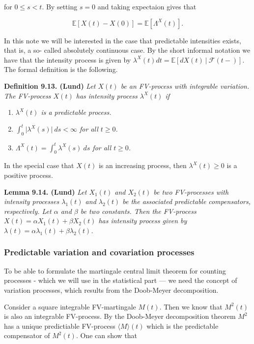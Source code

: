 \documentclass[a4paper,10pt,openany]{book}
\providecommand{\tightlist}{%
 \setlength{\itemsep}{0pt}\setlength{\parskip}{0pt}}
\begin{document}
for \(0\le s< t\). By setting \(s=0\) and taking expectaion gives that

\[
\mathbb E[X(t)-X(0)]=\mathbb E[\Lambda^X(t)].
\]

In this note we will be interested in the case that predictable intensities exists, that is, a so- called absolutely continuous case. By the short informal notation we have that the intensity process is given by \(\lambda^X(t)dt = \mathbb E[dX(t)\ \vert\ \mathcal F(t−)]\). The formal definition is the following.

\textbf{Definition 9.13. (Lund)} \emph{Let \(X(t)\) be an FV-process with integrable variation. The FV-process \(X(t)\) has intensity process \(\lambda^X(t)\) if}

\begin{enumerate}
\def\labelenumi{(\roman{enumi})}
\tightlist
\item
  \emph{\(\lambda ^X(t)\) is a predictable process.}
\item
  \emph{\(\int_0^t\vert \lambda^X(s)\vert\ ds<\infty\) for all \(t\ge 0\).}
\item
  \emph{\(\Lambda^X(t)=\int_0^t\lambda^X(s)\ ds\) for all \(t\ge 0\).}
\end{enumerate}

In the special case that \(X(t)\) is an increasing process, then \(\lambda^X(t) \ge 0\) is a positive process.

\textbf{Lemma 9.14. (Lund)} \emph{Let \(X_1(t)\) and \(X_2(t)\) be two FV-processes with intensity processes \(\lambda_1(t)\) and \(\lambda_2(t)\) be the associated predictable compensators, respectively. Let \(\alpha\) and \(\beta\) be two constants. Then the FV-process \(X(t) = \alpha X_1(t) + \beta X_2(t)\) has intensity process given by \(\lambda(t) = \alpha\lambda_1(t) + \beta\lambda_2(t)\).}

\hypertarget{predictable-variation-and-covariation-processes}{%
\subsubsection{Predictable variation and covariation processes}\label{predictable-variation-and-covariation-processes}}

To be able to formulate the martingale central limit theorem for counting processes - which we will use in the statistical part --- we need the concept of variation processes, which results from the Doob-Meyer decomposition.

Consider a square integrable FV-martingale \(M(t)\). Then we know that \(M^2(t)\) is also an integrable FV-process. By the Doob-Meyer decomposition theorem \(M^2\) has a unique predictiable FV-process \(\langle M\rangle (t)\) which is the predictable compensator of \(M^2(t)\). One can show that
\end{document}
